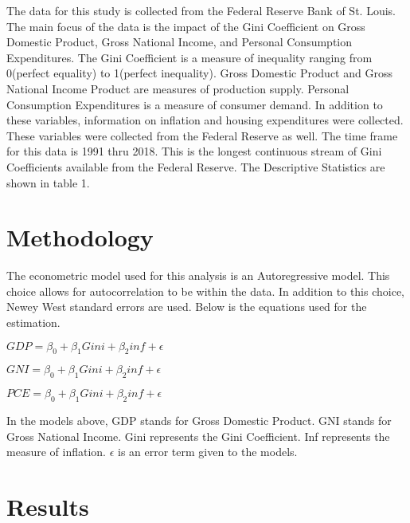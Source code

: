 \documentclass{article}
\begin{document}
\quad The data for this study is collected from the Federal Reserve Bank of St. Louis.  The main focus of the data is the impact of the Gini Coefficient on Gross Domestic Product, Gross National Income, and Personal Consumption Expenditures.  The Gini Coefficient is a measure of inequality ranging from 0(perfect equality) to 1(perfect inequality). Gross Domestic Product and Gross National Income Product are measures of production supply.  Personal Consumption Expenditures is a measure of consumer demand.
\vspace{2mm}
\quad In addition to these variables, information on inflation and housing expenditures were collected.  These variables were collected from the Federal Reserve as well.  The time frame for this data is 1991 thru 2018.  This is the longest continuous stream of Gini Coefficients available from the Federal Reserve.  The Descriptive Statistics are shown in table 1.  
\vspace{2mm}



\section{Methodology}
\vspace{2mm}

\quad The econometric model used for this analysis is an Autoregressive model.  This choice allows for autocorrelation to be within the data.  In addition to this choice, Newey West standard errors are used. Below is the equations used for the estimation.  

\vspace{2mm}

\centering $GDP=\beta_0+\beta_1Gini+\beta_2inf+\epsilon$
  \vspace{2mm}

\centering $GNI=\beta_0+\beta_1Gini+\beta_2inf+\epsilon$
  \vspace{2mm}

\centering $PCE=\beta_0+\beta_1Gini+\beta_2inf+\epsilon$
  \vspace{2mm}
\flushleft

\quad In the models above, GDP stands for Gross Domestic Product.  GNI stands for Gross National Income.  Gini represents the Gini Coefficient.  Inf represents the measure of inflation.  $\epsilon$ is an error term given to the models.  
\section{Results}
\end{document}
